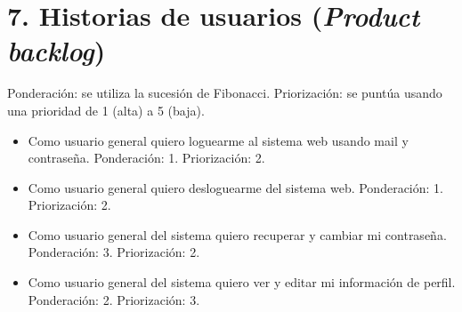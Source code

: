\documentclass[
11pt, %
codirector, %
]{charter}
\begin{document}
\section{7. Historias de usuarios (\textit{Product backlog})}
\label{sec:backlog}

Ponderación: se utiliza la sucesión de Fibonacci.
\newline Priorización: se puntúa usando una prioridad de 1 (alta) a 5 (baja).

\begin{itemize}
	\item Como usuario general quiero loguearme al sistema web usando mail y contraseña.
	\newline Ponderación: 1.
	\newline Priorización: 2.
	\item Como usuario general quiero desloguearme del sistema web.
	\newline Ponderación: 1.
	\newline Priorización: 2.
	\item Como usuario general del sistema quiero recuperar y cambiar mi contraseña.
	\newline Ponderación: 3.
	\newline Priorización: 2.
	\item Como usuario general del sistema quiero ver y editar mi información de perfil.
	\newline Ponderación: 2.
	\newline Priorización: 3.


\end{itemize}
\end{document}
